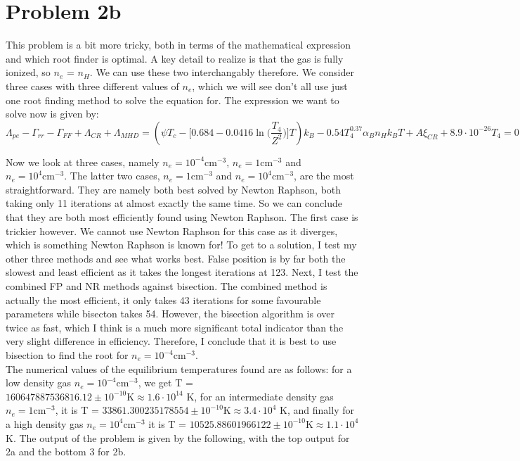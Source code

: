 

\section*{Problem 2b}

This problem is a bit more tricky, both in terms of the mathematical expression and which root finder is optimal. A key detail to realize is that the gas is fully ionized, so $n_e$ = $n_H$. We can use these two interchangably therefore. We consider three cases with three different values of $n_e$, which we will see don't all use just one root finding method to solve the equation for. The expression we want to solve now is given by:\\

\begin{equation*}
	\Lambda_{pe} - \Gamma_{rr} -  \Gamma_{FF} + \Lambda_{CR} + \Lambda_{MHD} = (\psi T_c - \Bigg[0.684 - 0.0416 \ln \Big(\frac{T_4}{Z^2}\Big) \Bigg] T)k_B - 0.54 T_4^{0.37} \alpha_B n_H k_B T + A \xi_{CR} + 8.9 \cdot 10^{-26} T_4 = 0 
\end{equation*}

Now we look at three cases, namely $n_e = 10^{-4} \text{cm}^{-3}$, $n_e = 1 \text{cm}^{-3}$ and $n_e = 10^{4} \text{cm}^{-3}$. The latter two cases, $n_e = 1 \text{cm}^{-3}$ and $n_e = 10^{4} \text{cm}^{-3}$, are the most straightforward. They are namely both best solved by Newton Raphson, both taking only 11 iterations at almost exactly the same time. So we can conclude that they are both most efficiently found using Newton Raphson. The first case is trickier however. We cannot use Newton Raphson for this case as it diverges, which is something Newton Raphson is known for! To get to a solution, I test my other three methods and see what works best. False position is by far both the slowest and least efficient as it takes the longest iterations at 123. Next, I test the combined FP and NR methods against bisection. The combined method is actually the most efficient, it only takes 43 iterations for some favourable parameters while bisecton takes 54. However, the bisection algorithm is over twice as fast, which I think is a much more significant total indicator than the very slight difference in efficiency. Therefore, I conclude that it is best to use bisection to find the root for $n_e = 10^{-4} \text{cm}^{-3}$.\\

The numerical values of the equilibrium temperatures found are as follows: for a low density gas $n_e = 10^{-4} \text{cm}^{-3}$, we get T = $160647887536816.12 \pm 10^{-10} \text{K} \approx 1.6 \cdot 10^{14}$ K, for an intermediate density gas $n_e = 1 \text{cm}^{-3}$, it is T = $33861.300235178554 \pm 10^{-10} \text{K} \approx 3.4 \cdot 10^{4}$ K, and finally for a high density gas $n_e = 10^{4} \text{cm}^{-3}$ it is T = $10525.88601966122 \pm 10^{-10} \text{K} \approx 1.1 \cdot 10^{4}$ K. The output of the problem is given by the following, with the top output for 2a and the bottom 3 for 2b.





